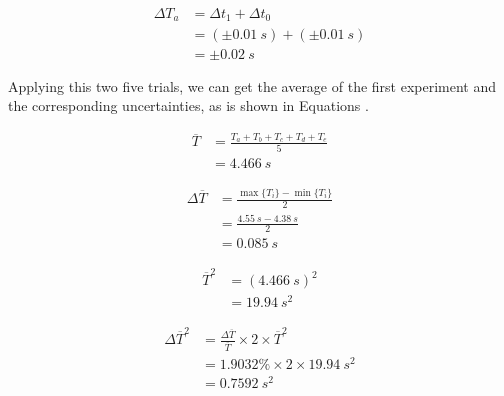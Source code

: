 \documentclass[a4paper]{article}
\begin{document}
\begin{equation}
    \begin{aligned}
        \Delta T_a &= \Delta t_1 + \Delta t_0 \\
                   &= (\pm \SI{0.01}{s}) + (\pm\SI{0.01}{s}) \\
                   &= \pm \SI{0.02}{s}
    \end{aligned}
    \label{eq.dta}
\end{equation}

Applying this two five trials, we can get the average of the first experiment and the corresponding uncertainties, as is shown in Equations .

\begin{equation}
    \begin{aligned}
        \overline{T} &= \frac{T_a + T_b + T_c + T_d + T_e}{5} \\
                &= \SI{4.466}{s}
    \end{aligned}
\end{equation}

\begin{equation}
    \begin{aligned}
        \Delta\overline{T} &= \frac{\max\{T_i\} - \min\{T_i\}}{2} \\
                      &= \frac{\SI{4.55}{s} - \SI{4.38}{s}}{2} \\
                      &= \SI{0.085}{s}
    \end{aligned}
\end{equation}

\begin{equation}
    \begin{aligned}
        \overline{T}^2 &= (\SI{4.466}{s})^2\\
                        &= \SI{19.94}{s^2}
    \end{aligned}
\end{equation}

\begin{equation}
    \begin{aligned}
        \Delta\overline{T}^2 &= \frac{\Delta\overline{T}}{\overline{T}}\times 2 \times \overline{T}^2\\
                        &= 1.9032\% \times 2 \times \SI{19.94}{s^2}\\
                        &= \SI{0.7592}{s^2}
    \end{aligned}
\end{equation}
\end{document}
